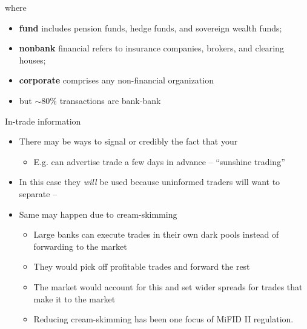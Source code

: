 \documentclass[english,10pt
,aspectratio=169
]{beamer}
\begin{document}
\begin{frame}
	where
	\begin{itemize}
		\item \textbf{fund} includes pension funds, hedge funds, and sovereign wealth funds; 
		\item \textbf{nonbank} financial refers to insurance companies, brokers, and clearing houses;
		\item \textbf{corporate} comprises any non-financial organization
		\item but $\sim 80\%$ transactions are bank-bank
	\end{itemize}
\end{frame}


\begin{frame}{In-trade information}
	\begin{itemize}
		\item There may be ways to signal or credibly  the fact that your 
		\begin{itemize}
			\item E.g. can advertise trade a few days in advance -- ``sunshine trading''
		\end{itemize}
		\item In this case they \emph{will} be used because uninformed traders will want to separate -- 
		\item Same may happen due to \alert{cream-skimming}
		\begin{itemize}
			\item Large banks can execute trades in their own dark pools instead of forwarding to the market
			\item They would pick off profitable trades and forward the rest
			\item The market would account for this and set wider spreads for trades that make it to the market
			\item Reducing cream-skimming has been one focus of MiFID II regulation.
		\end{itemize}
	\end{itemize}
\end{frame}
\end{document}
